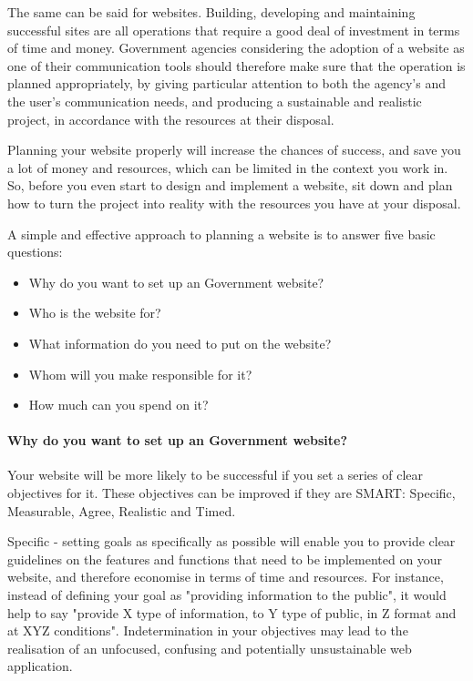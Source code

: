 The same can be said for websites. Building, developing and maintaining successful sites are all operations that require a good deal of investment in terms of time and money. Government agencies considering the adoption of a website as one of their communication tools should therefore make sure that the operation is planned appropriately, by giving particular attention to both the agency's and the user’s communication needs, and producing a sustainable and realistic project, in accordance with the resources at their disposal.

Planning your website properly will increase the chances of success, and save you a lot of money and resources, which can be limited in the context you work in. So, before you even start to design and implement a website, sit down and plan how to turn the project into reality with the resources you have at your disposal.

	A simple and effective approach to planning a website is to answer five basic questions:

	\begin{itemize}
		\item Why do you want to set up an Government website?
		\item Who is the website for?
		\item What information do you need to put on the website?
		\item Whom will you make responsible for it?
		\item How much can you spend on it?
	\end{itemize}

\paragraph{Why do you want to set up an Government website?}

Your website will be more likely to be successful if you set a series of clear objectives for it. These objectives can be improved if they are SMART: Specific, Measurable, Agree, Realistic and Timed.

Specific - setting goals as specifically as possible will enable you to provide clear guidelines on the features and functions that need to be implemented on your website, and therefore economise in terms of time and resources. For instance, instead of defining your goal as "providing information to the public", it would help to say "provide X type of information, to Y type of public, in Z format and at XYZ conditions". Indetermination in your objectives may lead to the realisation of an unfocused, confusing and potentially unsustainable web application.

